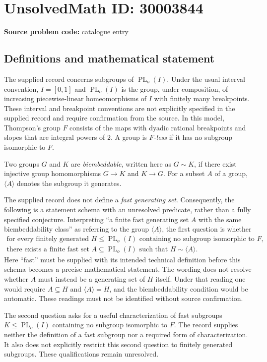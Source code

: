 \documentclass[11pt]{article}
\begin{document}
\section*{UnsolvedMath ID: 30003844}
\textbf{Source problem code:} catalogue entry
\subsection{Definitions and mathematical statement}
The supplied record concerns subgroups of \(\operatorname{PL}_o(I)\). Under the usual interval convention, \(I=[0,1]\) and \(\operatorname{PL}_o(I)\) is the group, under composition, of increasing piecewise-linear homeomorphisms of \(I\) with finitely many breakpoints. These interval and breakpoint conventions are not explicitly specified in the supplied record and require confirmation from the source. In this model, Thompson's group \(F\) consists of the maps with dyadic rational breakpoints and slopes that are integral powers of \(2\). A group is \emph{\(F\)-less} if it has no subgroup isomorphic to \(F\).

Two groups \(G\) and \(K\) are \emph{biembeddable}, written here as \(G\sim K\), if there exist injective group homomorphisms \(G\to K\) and \(K\to G\). For a subset \(A\) of a group, \(\langle A\rangle\) denotes the subgroup it generates.

The supplied record does not define a \emph{fast generating set}. Consequently, the following is a statement schema with an unresolved predicate, rather than a fully specified conjecture. Interpreting ``a finite fast generating set \(A\) with the same biembeddability class'' as referring to the group \(\langle A\rangle\), the first question is whether
\[
\begin{gathered}
\text{for every finitely generated }H\leq\operatorname{PL}_o(I)
\text{ containing no subgroup isomorphic to }F,\\
\text{there exists a finite fast set }A\subseteq\operatorname{PL}_o(I)
\text{ such that }H\sim\langle A\rangle.
\end{gathered}
\]
Here ``fast'' must be supplied with its intended technical definition before this schema becomes a precise mathematical statement. The wording does not resolve whether \(A\) must instead be a generating set of \(H\) itself. Under that reading one would require \(A\subseteq H\) and \(\langle A\rangle=H\), and the biembeddability condition would be automatic. These readings must not be identified without source confirmation.

The second question asks for a useful characterization of fast subgroups \(K\leq\operatorname{PL}_o(I)\) containing no subgroup isomorphic to \(F\). The record supplies neither the definition of a fast subgroup nor a required form of characterization. It also does not explicitly restrict this second question to finitely generated subgroups. These qualifications remain unresolved.
\end{document}
